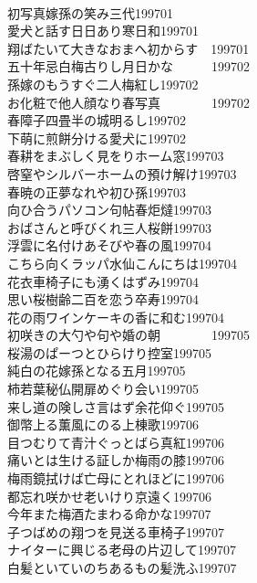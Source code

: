 \begin{multicols}{2}
\\初写真嫁孫の笑み三代\hfill{199701}
\\愛犬と話す日日あり寒日和\hfill{199701}
\\翔ばたいて大きなおまへ初からす　\hfill{199701　}
\\五十年忌白梅古りし月日かな　　　\hfill{199702　}
\\孫嫁のもうすぐ二人梅紅し\hfill{199702}
\\お化粧で他人顔なり春写真　　　　\hfill{199702　}
\\春障子四畳半の城明るし\hfill{199702}
\\下萌に煎餅分ける愛犬に\hfill{199702}
\\春耕をまぶしく見をりホーム窓\hfill{199703}
\\啓窒やシルバーホームの預け解け\hfill{199703}
\\春暁の正夢なれや初ひ孫\hfill{199703}
\\向ひ合うパソコン句帖春炬燵\hfill{199703　}
\\おばさんと呼びくれ三人桜餅\hfill{199703}
\\浮雲に名付けあそびや春の風\hfill{199704}
\\こちら向くラッパ水仙こんにちは\hfill{199704}
\\花衣車椅子にも湧くはずみ\hfill{199704}
\\思い桜樹齢二百を恋う卒寿\hfill{199704}
\\花の雨ワインケーキの香に和む\hfill{199704}
\\初咲きの大勺や句や婚の朝　　　　\hfill{199705}
\\桜湯のぱーつとひらけり控室\hfill{199705}
\\純白の花嫁孫となる五月\hfill{199705}
\\柿若葉秘仏開扉めぐり会い\hfill{199705}
\\来し道の険しさ言はず余花仰ぐ\hfill{199705}
\\御幣上る薫風にのる上棟歌\hfill{199706}
\\目つむりて青汁ぐっとばら真紅\hfill{199706}
\\痛いとは生ける証しか梅雨の膝\hfill{199706}
\\梅雨鏡拭けば亡母にとれほどに\hfill{199706}
\\都忘れ咲かせ老いけり京遠く\hfill{199706}
\\今年また梅酒たまわる命かな\hfill{199707}
\\子つばめの翔つを見送る車椅子\hfill{199707}
\\ナイターに興じる老母の片辺して\hfill{199707}
\\白髪といていのちあるもの髪洗ふ\hfill{199707}

\end{multicols}

